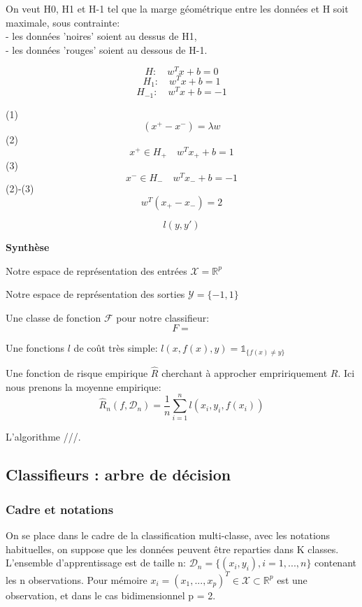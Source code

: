 \documentclass[a4paper]{article}
\theoremstyle{plain}
\begin{document}
On veut H0, H1 et H-1 tel que la marge géométrique entre les données et H soit maximale, sous contrainte:\\
- les données 'noires' soient au dessus de H1, \\
- les données 'rouges' soient au dessous de H-1.

$$H: \quad w^Tx+b=0$$
$$H_1: \quad w^Tx+b=1$$
$$H_{-1}: \quad w^Tx+b=-1$$

(1)$$ (x^+-x^-) = \lambda w $$
(2)$$ x^+ \in H_+ \quad w^T x_+ + b=1$$
(3)$$ x^- \in H_- \quad w^T x_- + b=-1$$
(2)-(3) $$w^T(x_+-x_-)=2 $$

$$l(y,y')$$

\textbf{Synthèse}\\

\begin{outline}

\1 Notre espace de représentation des entrées $\mathcal{X} = \mathbb{R}^p$

\1 Notre espace de représentation des sorties $\mathcal{Y}=\{-1,1\}$

\1 Une classe de fonction $\mathcal{F}$ pour notre classifieur: 
$$F = $$


\1 Une fonctions $l$ de coût très simple: $l(x, f(x),y) = \mathds{1}_{\{f(x)\neq y\}} $

\1 Une fonction de risque empirique $\hat R$ cherchant à approcher empririquement $R$. Ici nous prenons la moyenne empirique:
$$\hat R_n(f, \mathcal{D}_n) = \frac{1}{n}\sum_{i=1}^{n}\mathit{l}(x_i,y_i,f(x_i))$$

\1 L'algorithme ///.

\end{outline}






\pagebreak
\subsection{Classifieurs : arbre de décision}

\subsubsection{Cadre et notations}
On se place dans le cadre de la classification multi-classe, avec les notations habituelles, on suppose
que les données peuvent être reparties dans K classes. L’ensemble d’apprentissage est de taille n: $\mathcal{D}_n = \{(x_i,y_i), i=1,...,n\}$ contenant les n observations. Pour mémoire
$x_i = (x_1, ..., x_p)^T \in \mathcal{X}   \subset \mathbb{R}^p$ est une observation, et dans le cas bidimensionnel p = 2.
\end{document}
